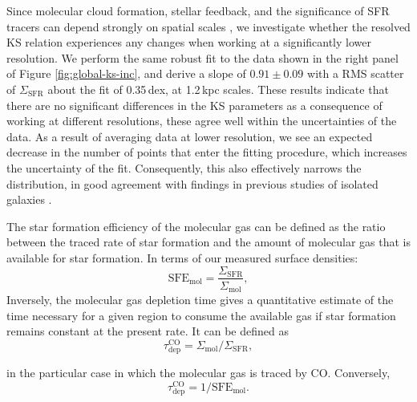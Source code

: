 \documentclass[longauth]{aa}
\begin{document}
Since molecular cloud formation, stellar feedback, and the significance of SFR tracers can depend strongly on spatial scales \citep[e.g.,][]{Orr2018,Hani2020}, we investigate whether the resolved KS relation experiences any changes when working at a significantly lower resolution. We perform the same robust fit to the data shown in the right panel of Figure \ref{fig:global-ks-inc}, and derive a slope of $0.91 \pm 0.09$ with a RMS scatter of $\Sigma_\mathrm{SFR}$ about the fit of 0.35\,dex, at 1.2\,kpc scales. These results indicate that there are no significant differences in the KS parameters as a consequence of working at different resolutions, these agree well within the uncertainties of the data. As a result of averaging data at lower resolution, we see an expected decrease in the number of points that enter the fitting procedure, which increases the uncertainty of the fit. Consequently, this also effectively narrows the distribution, in good agreement with findings in previous studies of isolated galaxies \citep[e.g.,][]{Bigiel2008,Schruba2010,Pessa2021}.

The star formation efficiency of the molecular gas can be defined as the ratio between the traced rate of star formation and the amount of molecular gas that is available for star formation. In terms of our measured surface densities:
\begin{equation}
    \textrm{SFE}_{\mathrm{mol}}=\frac{\Sigma_\mathrm{SFR}}{\Sigma_\mathrm{mol}},
    \label{eqn:sfe}
\end{equation}
Inversely, the molecular gas depletion time gives a quantitative estimate of the time necessary for a given region to consume the available gas if star formation remains constant at the present rate. It can be defined as
\begin{equation}
    \tau^{\mathrm{CO}}_\textrm{dep} = \Sigma_\textrm{mol}/\Sigma_\textrm{SFR},
\end{equation}

\noindent in the particular case in which the molecular gas is traced by CO. Conversely,
\begin{equation}
    \tau^{\mathrm{CO}}_\textrm{dep} = 1/\textrm{SFE}_\textrm{mol}.
\end{equation}
\end{document}
